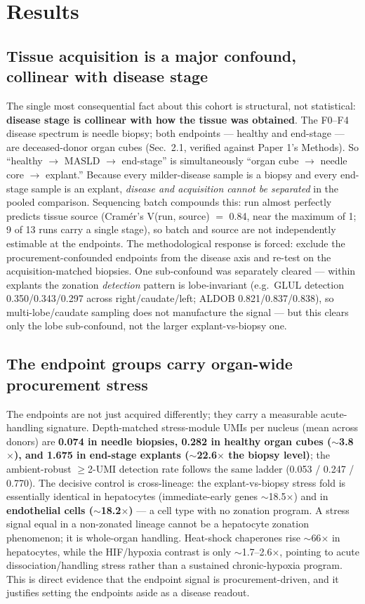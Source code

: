 \documentclass[11pt,a4paper]{article}
\begin{document}
\FloatBarrier
\section{Results}

\subsection{Tissue acquisition is a major confound, collinear with disease stage}

The single most consequential fact about this cohort is structural, not statistical: \textbf{disease stage is collinear with how the tissue was obtained}. The F0--F4 disease spectrum is needle biopsy; both endpoints --- healthy and end-stage --- are deceased-donor organ cubes (Sec.\ 2.1, verified against Paper 1's Methods). So ``healthy $\to$ MASLD $\to$ end-stage'' is simultaneously ``organ cube $\to$ needle core $\to$ explant.'' Because every milder-disease sample is a biopsy and every end-stage sample is an explant, \emph{disease and acquisition cannot be separated} in the pooled comparison. Sequencing batch compounds this: run almost perfectly predicts tissue source (Cram\'er's V(run, source) $=$ 0.84, near the maximum of 1; 9 of 13 runs carry a single stage), so batch and source are not independently estimable at the endpoints. The methodological response is forced: exclude the procurement-confounded endpoints from the disease axis and re-test on the acquisition-matched biopsies. One sub-confound was separately cleared --- within explants the zonation \emph{detection} pattern is lobe-invariant (e.g.\ GLUL detection 0.350/0.343/0.297 across right/caudate/left; ALDOB 0.821/0.837/0.838), so multi-lobe/caudate sampling does not manufacture the signal --- but this clears only the lobe sub-confound, not the larger explant-vs-biopsy one.

\subsection{The endpoint groups carry organ-wide procurement stress}

The endpoints are not just acquired differently; they carry a measurable acute-handling signature. Depth-matched stress-module UMIs per nucleus (mean across donors) are \textbf{0.074 in needle biopsies, 0.282 in healthy organ cubes ($\sim$3.8$\times$), and 1.675 in end-stage explants ($\sim$22.6$\times$ the biopsy level)}; the ambient-robust $\ge$2-UMI detection rate follows the same ladder (0.053 / 0.247 / 0.770). The decisive control is cross-lineage: the explant-vs-biopsy stress fold is essentially identical in hepatocytes (immediate-early genes $\sim$18.5$\times$) and in \textbf{endothelial cells ($\sim$18.2$\times$)} --- a cell type with no zonation program. A stress signal equal in a non-zonated lineage cannot be a hepatocyte zonation phenomenon; it is whole-organ handling. Heat-shock chaperones rise $\sim$66$\times$ in hepatocytes, while the HIF/hypoxia contrast is only $\sim$1.7--2.6$\times$, pointing to acute dissociation/handling stress rather than a sustained chronic-hypoxia program. This is direct evidence that the endpoint signal is procurement-driven, and it justifies setting the endpoints aside as a disease readout.
\end{document}

